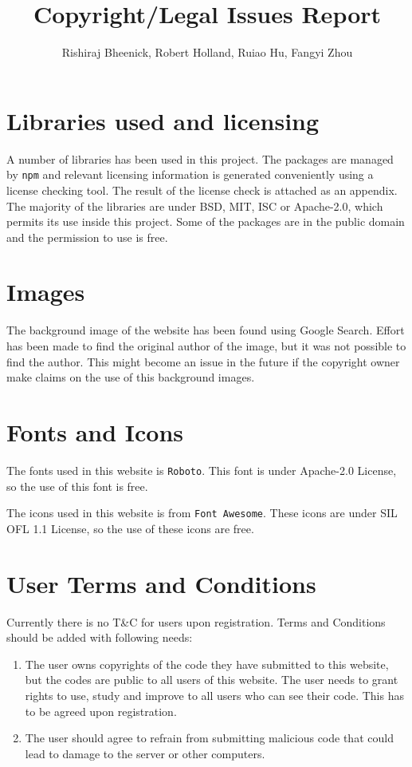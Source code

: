 \documentclass[a4paper]{article}
\title{Copyright/Legal Issues Report}
\author{Rishiraj Bheenick, Robert Holland, Ruiao Hu, Fangyi Zhou}
\begin{document}
\maketitle

\section{Libraries used and licensing}

A number of libraries has been used in this project. The packages are
managed by \texttt{npm} and relevant licensing information is generated
conveniently using a license checking tool. The result of the license check
is attached as an appendix. The majority of the libraries are under BSD, MIT,
ISC or Apache-2.0, which permits its use inside this project. Some of the
packages are in the public domain and the permission to use is free.

\section{Images}

The background image of the website has been found using Google Search. Effort
has been made to find the original author of the image, but it was not possible
to find the author. This might become an issue in the future if the copyright
owner make claims on the use of this background images.

\section{Fonts and Icons}

The fonts used in this website is \texttt{Roboto}. This font is under
Apache-2.0 License, so the use of this font is free.

The icons used in this website is from \texttt{Font Awesome}. These icons are
under SIL OFL 1.1 License, so the use of these icons are free.

\section{User Terms and Conditions}

Currently there is no T\&C for users upon registration. Terms and Conditions
should be added with following needs:
\begin{enumerate}
\item
The user owns copyrights of the code they have submitted to this website, but
the codes are public to all users of this website. The user needs to grant
rights to use, study and improve to all users who can see their code. This has
to be agreed upon registration.
\item
The user should agree to refrain from submitting malicious code that could
lead to damage to the server or other computers.
\end{enumerate}
\end{document}
